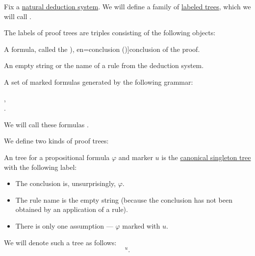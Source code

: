 \begin{definition}\label{def:natural_deduction_proof_tree}\mimprovised
  Fix a \hyperref[def:abstract_natural_deduction_system]{natural deduction system}. We will define a family of \hyperref[def:labeled_tree]{labeled trees}, which we will call .

  The labels of proof trees are triples consisting of the following objects:
  \begin{thmenum}[series=def:natural_deduction_proof_tree]
     A formula, called the \term[ru=conclusion (\cite[35]{TroelstraSchwichtenberg2000BasicProofTheory}), en=conclusion (\cite[36]{TroelstraSchwichtenberg2000BasicProofTheory})]{conclusion} of the proof.

     An empty string or the name of a rule from the deduction system.

     A set of marked formulas generated by the following grammar:
    \begin{bnf*}
                {}, \\
        { \bnfsp \bnftsq{:} \bnfsp {}}.
    \end{bnf*}

    We will call these formulas .
  \end{thmenum}

  We define two kinds of proof trees:
  \begin{thmenum}[resume=def:natural_deduction_proof_tree]
     An  tree for a propositional formula \( \varphi \) and marker \( u \) is the \hyperref[def:canonical_singleton_tree]{canonical singleton tree} with the following label:
    \begin{itemize}
      \item The conclusion is, unsurprisingly, \( \varphi \).
      \item The rule name is the empty string (because the conclusion has not been obtained by an application of a rule).
      \item There is only one assumption --- \( \varphi \) marked with \( u \).
    \end{itemize}

    We will denote such a tree as follows:
    \begin{equation*}
      [\varphi]^u.
    \end{equation*}


\end{thmenum}
\end{definition}
